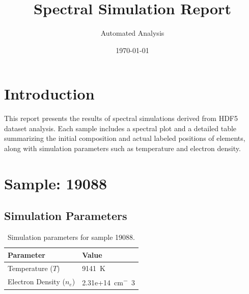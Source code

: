 \documentclass[a4paper,11pt]{article}
\title{Spectral Simulation Report}
\author{Automated Analysis}
\date{\today}
\begin{document}
\maketitle
\tableofcontents
\clearpage

\section{Introduction}
This report presents the results of spectral simulations derived from HDF5 dataset analysis. Each sample includes a spectral plot and a detailed table summarizing the initial composition and actual labeled positions of elements, along with simulation parameters such as temperature and electron density.


\section{Sample: 19088}
\subsection{Simulation Parameters}
\begin{table}[h!]
    \centering
    \begin{tabular}{ll}
        \toprule
        \textbf{Parameter} & \textbf{Value} \\
        \midrule
        Temperature ($T$) & 9141 \,\si{K} \\
        Electron Density ($n_e$) & 2.31e+14 \,\si{cm^-3} \\
        \bottomrule
    \end{tabular}
    \caption{Simulation parameters for sample 19088.}
    \label{tab:params_19088}
\end{table}
\end{document}
